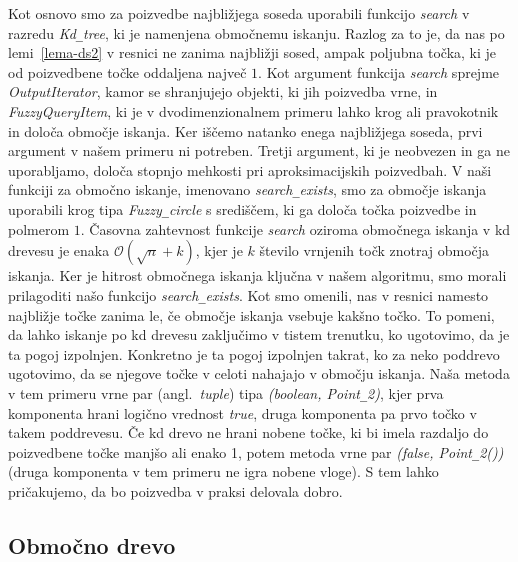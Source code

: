 \documentclass[a4paper, 12pt]{book}
\newcommand{\OO}{\ensuremath{\mathcal{O}}} %
\newcommand{\U}{\texttt{\_}}
\begin{document}
Kot osnovo smo za poizvedbe najbližjega soseda uporabili funkcijo \textit{search} v razredu \textit{Kd\U tree}, ki je namenjena območnemu iskanju. Razlog za to je, da nas po lemi~\ref{lema-ds2} v resnici ne zanima najbližji sosed, ampak poljubna točka, ki je od poizvedbene točke oddaljena največ $1$. Kot argument funkcija \textit{search} sprejme \textit{OutputIterator}, kamor se shranjujejo objekti, ki jih poizvedba vrne, in \textit{FuzzyQueryItem}, ki je v dvodimenzionalnem primeru lahko krog ali pravokotnik in določa območje iskanja. Ker iščemo natanko enega najbližjega soseda, prvi argument v našem primeru ni potreben. Tretji argument, ki je neobvezen in ga ne uporabljamo, določa stopnjo mehkosti pri aproksimacijskih poizvedbah. V naši funkciji za območno iskanje, imenovano \textit{search\U exists}, smo za območje iskanja uporabili krog tipa \textit{Fuzzy\U circle} s središčem, ki ga določa točka poizvedbe in polmerom $1$. Časovna zahtevnost funkcije \textit{search} oziroma območnega iskanja v kd drevesu je enaka $\OO(\sqrt{n} + k)$, kjer je $k$ število vrnjenih točk znotraj območja iskanja. Ker je hitrost območnega iskanja ključna v našem algoritmu, smo morali prilagoditi našo funkcijo \textit{search\U exists}. Kot smo omenili, nas v resnici namesto najbližje točke zanima le, če območje iskanja vsebuje kakšno točko. To pomeni, da lahko iskanje po kd drevesu zaključimo v tistem trenutku, ko ugotovimo, da je ta pogoj izpolnjen. Konkretno je ta pogoj izpolnjen takrat, ko za neko poddrevo ugotovimo, da se njegove točke v celoti nahajajo v območju iskanja. Naša metoda v tem primeru vrne par (angl.~\textit{tuple}) tipa \textit{(boolean, Point\U 2)}, kjer prva komponenta hrani logično vrednost \textit{true}, druga komponenta pa prvo točko v takem poddrevesu. Če kd drevo ne hrani nobene točke, ki bi imela razdaljo do poizvedbene točke manjšo ali enako 1, potem metoda vrne par \textit{(false, Point\U 2())} (druga komponenta v tem primeru ne igra nobene vloge). S tem lahko pričakujemo, da bo poizvedba v praksi delovala dobro.

\subsection{Območno drevo}
\end{document}
